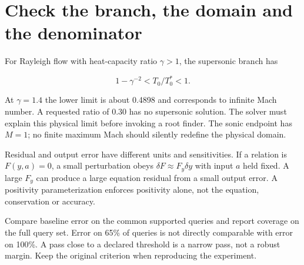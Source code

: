 \section*{Check the branch, the domain and the denominator}
For Rayleigh flow with heat-capacity ratio $\gamma>1$, the supersonic branch has

\[1-\gamma^{-2}<T_0/T_0^*<1.\]

At $\gamma=1.4$ the lower limit is about 0.4898 and corresponds to infinite
Mach number. A requested ratio of 0.30 has no supersonic solution. The solver
must explain this physical limit before invoking a root finder. The sonic endpoint
has $M=1$; no finite maximum Mach should silently redefine the physical domain.

Residual and output error have different units and sensitivities. If a relation
is $F(y,a)=0$, a small perturbation obeys $\delta F\approx F_y\delta y$ with
input $a$ held fixed. A large $F_y$ can produce a large equation residual from a
small output error. A positivity parameterization enforces positivity alone,
not the equation, conservation or accuracy.

Compare baseline error on the common supported queries and report coverage on
the full query set. Error on 65\% of queries is not directly comparable with
error on 100\%. A pass close to a declared threshold is a narrow pass, not a
robust margin. Keep the original criterion when reproducing the experiment.
